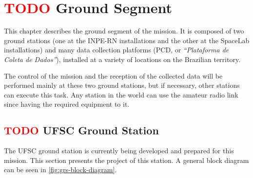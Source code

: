 %
%
%
%
%

%
%
%
%
%

\chapter{ \textcolor{red}{TODO} Ground Segment} \label{ch:ground-segment}

This chapter describes the ground segment of the mission. It is composed of two ground stations (one at the INPE-RN installations and the other at the SpaceLab installations) and many data collection platforms (PCD, or \textit{``Plataforma de Coleta de Dados''}), installed at a variety of locations on the Brazilian territory.

The control of the mission and the reception of the collected data will be performed mainly at these two ground stations, but if necessary, other stations can execute this task. Any station in the world can use the amateur radio link since having the required equipment to it.

\section{ \textcolor{red}{TODO} UFSC Ground Station}

The UFSC ground station is currently being developed and prepared for this mission. This section presents the project of this station. A general block diagram can be seen in \autoref{fig:grs-block-diagram}.

